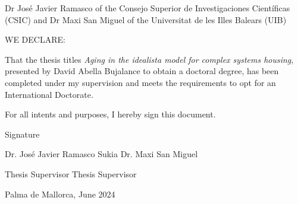 \thispagestyle{empty}

Dr Jos\'e Javier Ramasco of the Consejo Superior de Investigaciones Cient\'ificas (CSIC) and Dr Maxi San Miguel of the Universitat de les Illes Balears (UIB)

\vspace*{2 cm}

WE DECLARE:

\vspace*{1 cm}

That the thesis titles \textit{Aging in the idealista model for complex systems housing}, presented by David Abella Bujalance to obtain a doctoral degree, has been completed under my supervision and meets the requirements to opt for an International Doctorate.

\vspace*{2 cm}

For all intents and purposes, I hereby sign this document.

\vspace*{2 cm}

Signature

\vspace*{3 cm}

      Dr. Jos\'e Javier Ramasco Sukia              \hfill Dr. Maxi San Miguel


\vspace*{0.1 cm}

        Thesis Supervisor              \hfill Thesis Supervisor

\vspace*{1 cm}

        Palma de Mallorca, June 2024

\vfill